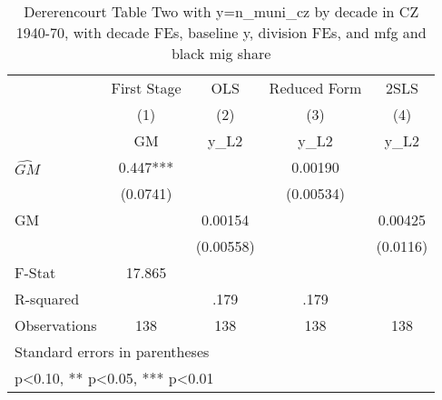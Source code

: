 \begin{table}[htbp]\centering
\def\sym#1{\ifmmode^{#1}\else\(^{#1}\)\fi}
\caption{Dererencourt Table Two with y=n\_muni\_cz by decade in CZ 1940-70, with decade FEs, baseline y, division FEs, and mfg and black mig share}
\begin{tabular}{l*{4}{c}}
\toprule
                    & First Stage   &         OLS   &Reduced Form   &        2SLS   \\
                    &\multicolumn{1}{c}{(1)}&\multicolumn{1}{c}{(2)}&\multicolumn{1}{c}{(3)}&\multicolumn{1}{c}{(4)}\\
                    &\multicolumn{1}{c}{GM}&\multicolumn{1}{c}{y\_L2}&\multicolumn{1}{c}{y\_L2}&\multicolumn{1}{c}{y\_L2}\\
\midrule
$\hat{GM}$          &       0.447***&               &     0.00190   &               \\
                    &    (0.0741)   &               &   (0.00534)   &               \\
\addlinespace
GM                  &               &     0.00154   &               &     0.00425   \\
                    &               &   (0.00558)   &               &    (0.0116)   \\
\midrule
F-Stat              &      17.865   &               &               &               \\
R-squared           &               &        .179   &        .179   &               \\
Observations        &         138   &         138   &         138   &         138   \\
\bottomrule
\multicolumn{5}{l}{\footnotesize Standard errors in parentheses}\\
\multicolumn{5}{l}{\footnotesize * p<0.10, ** p<0.05, *** p<0.01}\\
\end{tabular}
\end{table}
